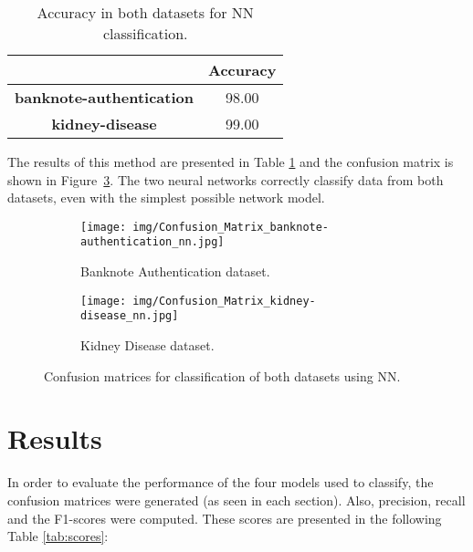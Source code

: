 \documentclass[11pt,a4paper]{article}
\begin{document}
\begin{table}[h!]
    \centering
    \begin{tabular}{|c|c|}
    \hline
    \bf & \bf Accuracy \\\hline
    \bf banknote-authentication  & 98.00  \\\hline
    \bf kidney-disease & 99.00 \\\hline
    \end{tabular}
    \caption{Accuracy in both datasets for NN classification.}
    \label{tab:NN_accuracy}
\end{table}

The results of this method are presented in Table \ref{tab:NN_accuracy} and the confusion matrix is shown in Figure~\ref{cm_nn}. The two neural networks correctly classify data from both datasets, even with the simplest possible network model.

\begin{figure}[H]
\centering
\begin{subfigure}{.5\textwidth}
  \centering
  \texttt{[image: img/Confusion\_Matrix\_banknote-authentication\_nn.jpg]}
  \caption{Banknote Authentication dataset.}
  \label{fig:sub1}
\end{subfigure}%
\begin{subfigure}{.5\textwidth}
  \centering
  \texttt{[image: img/Confusion\_Matrix\_kidney-disease\_nn.jpg]}
  \caption{Kidney Disease dataset.}
  \label{fig:sub2}
\end{subfigure}
\caption{Confusion matrices for classification of both datasets using NN.}
\label{cm_nn}
\end{figure}


\section{Results}
In order to evaluate the performance of the four models used to classify, the confusion matrices were generated (as seen in each section). Also, precision, recall and the F1-scores were computed. These scores are presented in the following Table \ref{tab:scores}:
\end{document}
